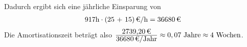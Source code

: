 Dadurch ergibt sich eine jährliche Einsparung von 
\begin{eqnarray}
917 \mbox{h} \cdot \eur{(25 + 15)}{\mbox{/h}} = \eur{36680}
\end{eqnarray}
\setcounter{equation}{0}
Die Amortisationszeit beträgt also $\frac{\eur{2739,20}}{\eur{36680}\mbox{/Jahr}} \approx 0,07 \mbox{ Jahre} \approx 4 \mbox{ Wochen}$.